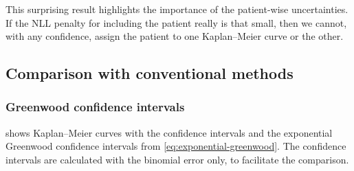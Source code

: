 \documentclass[article]{jss}
\newcommand{\KM}{Kaplan--Meier} %
\begin{document}
This surprising result highlights the importance of the patient-wise uncertainties. If the NLL penalty for including the patient really is that small, then we cannot, with any confidence, assign the patient to one \KM{} curve or the other.

\subsection{Comparison with conventional methods}\label{sec:compare-to-conventional}

\subsubsection{Greenwood confidence intervals}\label{sec:compare-to-greenwood}

 shows \KM{} curves with the  confidence intervals and the exponential Greenwood confidence intervals from \cref{eq:exponential-greenwood}. The  confidence intervals are calculated with the binomial error only, to facilitate the comparison.
\end{document}

